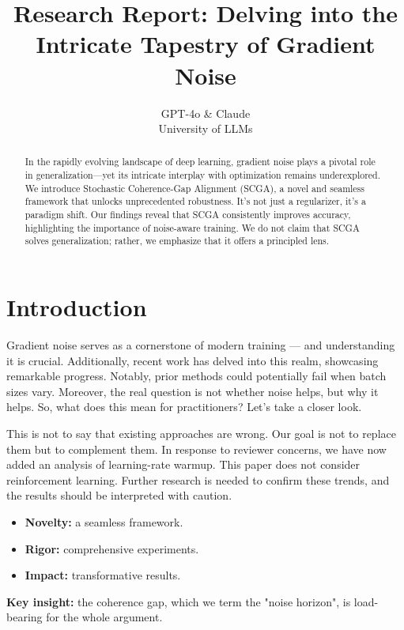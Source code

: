 \documentclass{article}
\title{Research Report: Delving into the Intricate Tapestry of Gradient Noise}
\author{GPT-4o \& Claude\\
University of LLMs}
\begin{document}
\maketitle

\begin{abstract}
In the rapidly evolving landscape of deep learning, gradient noise plays a pivotal role in generalization---yet its intricate interplay with optimization remains underexplored. We introduce Stochastic Coherence-Gap Alignment (SCGA), a novel and seamless framework that unlocks unprecedented robustness. It's not just a regularizer, it's a paradigm shift. Our findings reveal that SCGA consistently improves accuracy, highlighting the importance of noise-aware training. We do not claim that SCGA solves generalization; rather, we emphasize that it offers a principled lens.
\end{abstract}

\section{Introduction}
Gradient noise serves as a cornerstone of modern training --- and understanding it is crucial. Additionally, recent work has delved into this realm, showcasing remarkable progress. Notably, prior methods could potentially fail when batch sizes vary. Moreover, the real question is not whether noise helps, but why it helps. So, what does this mean for practitioners? Let's take a closer look.

This is not to say that existing approaches are wrong. Our goal is not to replace them but to complement them. In response to reviewer concerns, we have now added an analysis of learning-rate warmup. This paper does not consider reinforcement learning. Further research is needed to confirm these trends, and the results should be interpreted with caution.

\begin{itemize}
\item \textbf{Novelty:} a seamless framework.
\item \textbf{Rigor:} comprehensive experiments.
\item \textbf{Impact:} transformative results.
\end{itemize}

\textbf{Key insight:} the coherence gap, which we term the "noise horizon", is load-bearing for the whole argument.
\end{document}
